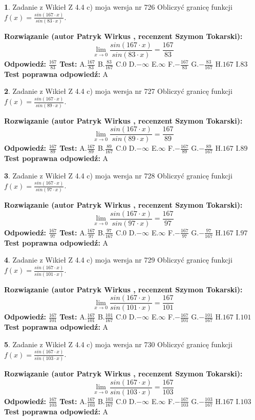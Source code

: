 \documentclass[12pt, a4paper]{article}
\theoremstyle{definition} %
\newtheorem{zad}{}
\newcommand{\zadStart}[1]{\begin{zad}#1\newline}
\newcommand{\zadStop}{\end{zad}}
\newcommand{\rozwStart}[2]{\noindent \textbf{Rozwiązanie (autor #1 , recenzent #2): }\newline}
\newcommand{\rozwStop}{\newline}
\newcommand{\odpStart}{\noindent \textbf{Odpowiedź:}\newline}
\newcommand{\odpStop}{\newline}
\newcommand{\testStart}{\noindent \textbf{Test:}\newline}
\newcommand{\testStop}{\newline}
\newcommand{\kluczStart}{\noindent \textbf{Test poprawna odpowiedź:}\newline}
\newcommand{\kluczStop}{\newline}
\begin{document}
\zadStart{Zadanie z Wikieł Z 4.4 c) moja wersja nr 726}
Obliczyć granicę funkcji $f(x)=\frac{sin(167\cdot x)}{sin(83\cdot x)}$.
\zadStop
\rozwStart{Patryk Wirkus}{Szymon Tokarski}
$$\lim\limits_{x\to 0}\frac{sin(167\cdot x)}{sin(83\cdot x)}=
\frac{167}{83}$$
\rozwStop
\odpStart
$\frac{167}{83}$
\odpStop
\testStart
A.$\frac{167}{83}$
B.$\frac{83}{167}$
C.$0$
D.$-\infty$
E.$\infty$
F.$-\frac{167}{83}$
G.$-\frac{83}{167}$
H.$167$
I.$83$
\testStop
\kluczStart
A
\kluczStop



\zadStart{Zadanie z Wikieł Z 4.4 c) moja wersja nr 727}
Obliczyć granicę funkcji $f(x)=\frac{sin(167\cdot x)}{sin(89\cdot x)}$.
\zadStop
\rozwStart{Patryk Wirkus}{Szymon Tokarski}
$$\lim\limits_{x\to 0}\frac{sin(167\cdot x)}{sin(89\cdot x)}=
\frac{167}{89}$$
\rozwStop
\odpStart
$\frac{167}{89}$
\odpStop
\testStart
A.$\frac{167}{89}$
B.$\frac{89}{167}$
C.$0$
D.$-\infty$
E.$\infty$
F.$-\frac{167}{89}$
G.$-\frac{89}{167}$
H.$167$
I.$89$
\testStop
\kluczStart
A
\kluczStop



\zadStart{Zadanie z Wikieł Z 4.4 c) moja wersja nr 728}
Obliczyć granicę funkcji $f(x)=\frac{sin(167\cdot x)}{sin(97\cdot x)}$.
\zadStop
\rozwStart{Patryk Wirkus}{Szymon Tokarski}
$$\lim\limits_{x\to 0}\frac{sin(167\cdot x)}{sin(97\cdot x)}=
\frac{167}{97}$$
\rozwStop
\odpStart
$\frac{167}{97}$
\odpStop
\testStart
A.$\frac{167}{97}$
B.$\frac{97}{167}$
C.$0$
D.$-\infty$
E.$\infty$
F.$-\frac{167}{97}$
G.$-\frac{97}{167}$
H.$167$
I.$97$
\testStop
\kluczStart
A
\kluczStop



\zadStart{Zadanie z Wikieł Z 4.4 c) moja wersja nr 729}
Obliczyć granicę funkcji $f(x)=\frac{sin(167\cdot x)}{sin(101\cdot x)}$.
\zadStop
\rozwStart{Patryk Wirkus}{Szymon Tokarski}
$$\lim\limits_{x\to 0}\frac{sin(167\cdot x)}{sin(101\cdot x)}=
\frac{167}{101}$$
\rozwStop
\odpStart
$\frac{167}{101}$
\odpStop
\testStart
A.$\frac{167}{101}$
B.$\frac{101}{167}$
C.$0$
D.$-\infty$
E.$\infty$
F.$-\frac{167}{101}$
G.$-\frac{101}{167}$
H.$167$
I.$101$
\testStop
\kluczStart
A
\kluczStop



\zadStart{Zadanie z Wikieł Z 4.4 c) moja wersja nr 730}
Obliczyć granicę funkcji $f(x)=\frac{sin(167\cdot x)}{sin(103\cdot x)}$.
\zadStop
\rozwStart{Patryk Wirkus}{Szymon Tokarski}
$$\lim\limits_{x\to 0}\frac{sin(167\cdot x)}{sin(103\cdot x)}=
\frac{167}{103}$$
\rozwStop
\odpStart
$\frac{167}{103}$
\odpStop
\testStart
A.$\frac{167}{103}$
B.$\frac{103}{167}$
C.$0$
D.$-\infty$
E.$\infty$
F.$-\frac{167}{103}$
G.$-\frac{103}{167}$
H.$167$
I.$103$
\testStop
\kluczStart
A
\kluczStop
\end{document}
